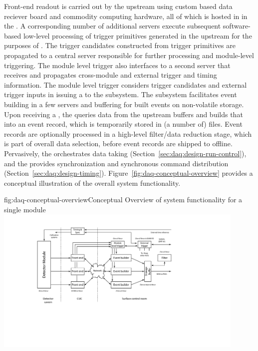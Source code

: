 Front-end readout is carried out by the upstream  using
custom  based data reciever board and commodity computing hardware, 
all of which is hosted in  in the . A
corresponding number of additional servers execute
subsequent software-based low-level processing of trigger
primitives
generated in the upstream  for the purposes of . 
The trigger candidates constructed from trigger primitives are propagated to a central server responsible
for further processing and module-level triggering. The module level
trigger also
interfaces to a second server that receives and
propagates cross-module and external trigger and timing
information. The module level trigger considers trigger candidates and
external trigger inputs in issuing a  to the 
subsystem. The  subsystem 
facilitates event building in a few servers and buffering for built
events on non-volatile storage. Upon receiving a , the 
 queries
data from the upstream  buffers and builds that into an event
record, which is temporarily stored in (a number of) files. Event records are optionally processed in a high-level
filter/data reduction stage, which is part of overall data selection,
 before event records are shipped to  offline. Pervasively,
 the   orchestrates data taking 
 (Section~\ref{sec:daq:design-run-control}), and the
  provides synchronization and synchronous command distribution
 (Section~\ref{sec:daq:design-timing}). Figure~\ref{fig:daq-conceptual-overview}
 provides a conceptual illustration of the overall  system
 functionality.



\begin{dunefigure}{fig:daq-conceptual-overview}{Conceptual
   Overview of  system functionality for a single \nominalmodsize module}
  \includegraphics[width=0.9\textwidth]{daq-overview.pdf}
\end{dunefigure}

